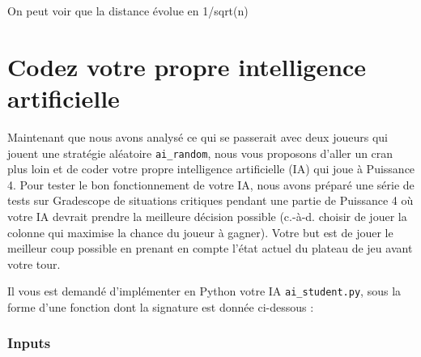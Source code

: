 \documentclass[11pt,answers]{exam}
\begin{document}
\begin{solutionbox}{25mm}
On peut voir que la distance évolue en 1/sqrt(n)

\end{solutionbox}

\newpage

\section{Codez votre propre intelligence artificielle}

Maintenant que nous avons analysé ce qui se passerait avec deux joueurs qui jouent une stratégie aléatoire \texttt{ai\_random}, nous vous proposons d’aller un cran plus loin et de coder votre propre intelligence artificielle (IA) qui joue à Puissance 4. 
Pour tester le bon fonctionnement de votre IA, nous avons préparé une série de tests sur Gradescope de situations critiques pendant une partie de Puissance 4 où votre IA devrait prendre la meilleure décision possible (c.-à-d. choisir de jouer la colonne qui maximise la chance du joueur à gagner). Votre but est de jouer le meilleur coup possible en prenant en compte l'état actuel du plateau de jeu avant votre tour.

\medskip

Il vous est demandé d'implémenter en Python votre IA \texttt{ai\_student.py}, sous la forme d'une fonction dont la signature est donnée ci-dessous :




\subsubsection*{Inputs}
\end{document}
